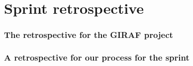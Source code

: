 \section{Sprint retrospective}

\subsubsection{The retrospective for the GIRAF project}

\subsubsection{A retrospective for our process for the sprint}